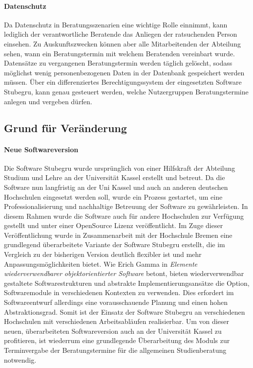 \paragraph{Datenschutz}
Da Datenschutz in Beratungsszenarien eine wichtige Rolle einnimmt, kann
lediglich der verantwortliche Beratende das Anliegen der ratsuchenden Person
einsehen. Zu Auskunftszwecken können aber alle Mitarbeitenden der Abteilung
sehen, wann ein Beratungstermin mit welchem Beratenden vereinbart wurde.
Datensätze zu vergangenen Beratungstermin werden täglich gelöscht, sodass
möglichst wenig personenbezogenen Daten in der Datenbank gespeichert werden
müssen. Über ein differenziertes Berechtigungssystem der eingesetzten Software
Stubegru, kann genau gesteuert werden, welche Nutzergruppen Beratungstermine
anlegen und vergeben dürfen.

\subsection{Grund für Veränderung}

\paragraph{Neue Softwareversion}
Die Software Stubegru wurde ursprünglich von einer Hilfskraft der Abteilung
Studium und Lehre an der Universität Kassel erstellt und betreut. Da die
Software nun langfristig an der Uni Kassel und auch an anderen deutschen
Hochschulen eingesetzt werden soll, wurde ein Prozess gestartet, um eine
Professionalisierung und nachhaltige Betreuung der Software zu gewährleisten.
In diesem Rahmen wurde die Software auch für andere Hochschulen zur Verfügung
gestellt und unter einer OpenSource Lizenz veröffentlicht. Im Zuge dieser
Veröffentlichung wurde in Zusammenarbeit mit der Hochschule Bremen eine
grundlegend überarbeitete Variante der Software Stubegru erstellt, die im
Vergleich zu der bisherigen Version deutlich flexibler ist und mehr
Anpassungsmöglichkeiten bietet. Wie Erich Gamma in \textit{Elemente
    wiederverwendbarer objektorientierter Software} betont, bieten wiederverwendbar
gestaltete Softwarestrukturen und abstrakte Implementierungsansätze die Option,
Softwaremodule in verschiedenen Kontexten zu verwenden. Dies erfordert im
Softwareentwurf allerdings eine vorausschauende Planung und einen hohen
Abstraktionsgrad.\cite{wiederverwSoftware} Somit ist der Einsatz der Software
Stubegru an verschiedenen Hochschulen mit verschiedenen Arbeitsabläufen
realisierbar. Um von dieser neuen, überarbeiteten Softwareversion auch an der
Universität Kassel zu profitieren, ist wiederrum eine grundlegende
Überarbeitung des Moduls zur Terminvergabe der Beratungstermine für die
allgemeinen Studienberatung notwendig.

